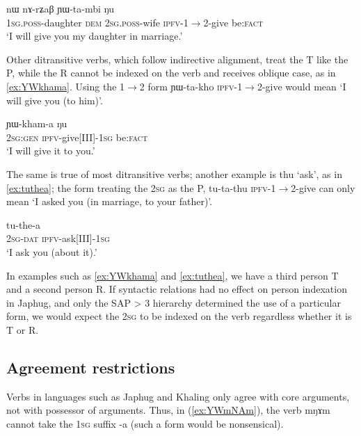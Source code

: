 \documentclass[oldfontcommands,oneside,a4paper,11pt]{article}
\newcommand{\ipa}[1]{{\phon \mbox{#1}}} %
\begin{document}
\begin{exe}
\ex \label{ex:YWtambi}
\gll \ipa{a-me} 	\ipa{nɯ} 	\ipa{nɤ-rʑaβ} 	\ipa{ɲɯ-ta-mbi} 	\ipa{ŋu} \\
\textsc{1sg.poss}-daughter \textsc{dem} \textsc{2sg.poss}-wife \textsc{ipfv}-1$\rightarrow$2-give be:\textsc{fact} \\
\glt `I will give you my daughter in marriage.'
\end{exe}

Other ditransitive verbs, which follow indirective alignment, treat the T like the P, while the R cannot be indexed on the verb and receives oblique case, as in \ref{ex:YWkhama}. Using the 1$\rightarrow$2 form \ipa{ɲɯ-ta-kho} \textsc{ipfv}-1$\rightarrow$2-give would mean `I will give you (to him)'.

\begin{exe}
\ex \label{ex:YWkhama}
\gll \ipa{nɤʑɯɣ} 	\ipa{ɲɯ-kham-a} \ipa{ŋu} \\
\textsc{2sg:gen} \textsc{ipfv}-give[III]-\textsc{1sg} be:\textsc{fact} \\
\glt `I will give it to you.'
\end{exe}

The same is true of most ditransitive verbs; another example is \ipa{thu} `ask', as in \ref{ex:tuthea}; the form treating the \textsc{2sg} as the P, \ipa{tu-ta-thu} \textsc{ipfv}-1$\rightarrow$2-give can only mean `I asked you (in marriage, to your father)'.

\begin{exe}
\ex \label{ex:tuthea}
\gll \ipa{nɤ-ɕki} 	\ipa{tu-the-a} \\
\textsc{2sg-dat} \textsc{ipfv}-ask[III]-\textsc{1sg} \\
\glt `I ask you (about it).'
\end{exe}

In examples such as \ref{ex:YWkhama} and \ref{ex:tuthea}, we have a third person T and a second person R. If syntactic relations had no effect on person indexation in Japhug, and only the SAP > 3 hierarchy determined the use of a particular form, we would expect the \textsc{2sg} to be indexed on the verb regardless whether it is T or R.

\subsection{Agreement restrictions}
Verbs in languages such as Japhug and Khaling only agree with core arguments, not with possessor of arguments. Thus, in (\ref{ex:YWmNAm}), the verb \ipa{mŋɤm} cannot take the \textsc{1sg} suffix \ipa{-a} (such a form would be nonsensical).
\end{document}
